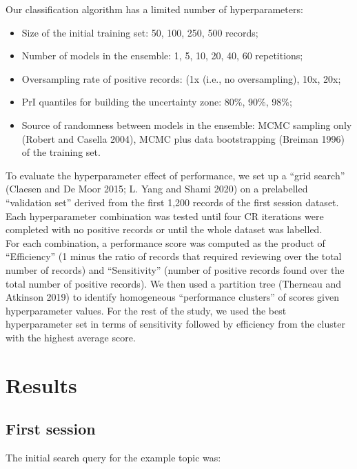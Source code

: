 \documentclass{article}
\providecommand{\tightlist}{%
  \setlength{\itemsep}{0pt}\setlength{\parskip}{0pt}}
\begin{document}
Our classification algorithm has a limited number of hyperparameters:

\begin{itemize}
\tightlist
\item
  Size of the initial training set: 50, 100, 250, 500 records;
\item
  Number of models in the ensemble: 1, 5, 10, 20, 40, 60 repetitions;
\item
  Oversampling rate of positive records: (1x (i.e., no oversampling),
  10x, 20x;
\item
  PrI quantiles for building the uncertainty zone: 80\%, 90\%, 98\%;
\item
  Source of randomness between models in the ensemble: MCMC sampling
  only (Robert and Casella 2004), MCMC plus data bootstrapping (Breiman
  1996) of the training set.
\end{itemize}

To evaluate the hyperparameter effect of performance, we set up a ``grid
search'' (Claesen and De Moor 2015; L. Yang and Shami 2020) on a
prelabelled ``validation set'' derived from the first 1,200 records of
the first session dataset. Each hyperparameter combination was tested
until four CR iterations were completed with no positive records or
until the whole dataset was labelled.\\
For each combination, a performance score was computed as the product of
``Efficiency'' (1 minus the ratio of records that required reviewing
over the total number of records) and ``Sensitivity'' (number of
positive records found over the total number of positive records). We
then used a partition tree (Therneau and Atkinson 2019) to identify
homogeneous ``performance clusters'' of scores given hyperparameter
values. For the rest of the study, we used the best hyperparameter set
in terms of sensitivity followed by efficiency from the cluster with the
highest average score.\\

\hypertarget{results}{%
\section{Results}\label{results}}

\hypertarget{first-session}{%
\subsection{First session}\label{first-session}}

The initial search query for the example topic was:\\
\end{document}
